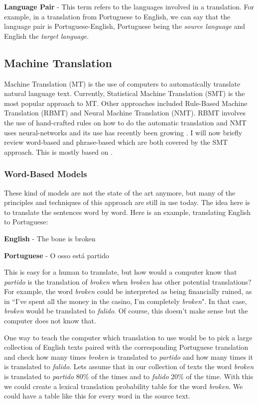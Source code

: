 \textbf{Language Pair} - This term refers to the languages involved in a translation. For example, in a translation from Portuguese to English, we can say that the language pair is Portuguese-English, Portuguese being the \textit{source language} and English the \textit{target language}.


\subsection{Machine Translation}

Machine Translation (MT) is the use of computers to automatically translate natural language text. Currently, Statistical Machine Translation (SMT) is the most popular approach to MT. Other approaches included Rule-Based Machine Translation (RBMT) and  Neural Machine Translation (NMT). RBMT involves the use of hand-crafted rules on how to do the automatic translation and NMT uses neural-networks and its use has recently been growing \citep{Bentivogli2016}. I will now briefly review word-based and phrase-based which are both covered by the SMT approach. This is mostly based on \citep{Koehn2010}.

\subsubsection{Word-Based Models}

These kind of models are not the state of the art anymore, but many of the principles and techniques of this approach are still in use today. The idea here is to translate the sentences word by word. Here is an example, translating English to Portuguese:

\begin{center}
\textbf{English}    - The bone    is      broken

\textbf{Portuguese} -  O  osso   está     partido
\end{center}

This is easy for a human to translate, but how would a computer know that \textit{partido} is the translation of \textit{broken} when \textit{broken} has other potential translations? For example, the word \textit{broken} could be interpreted as being financially ruined, as in “I’ve spent all the money in the casino, I'm completely \textit{broken}". In that case, \textit{broken} would be translated to \textit{falido}. Of course, this doesn't make sense but the computer does not know that.

One way to teach the computer which translation to use would be to pick a large collection of English texts paired with the corresponding Portuguese translation and check how many times \textit{broken} is translated to \textit{partido} and how many times it is translated to \textit{falido}. Lets assume that in our collection of texts the word \textit{broken} is translated to \textit{partido} 80\% of the times and to \textit{falido} 20\% of the time. With this we could create a lexical translation probability table for the word \textit{broken}. We could have a table like this for every word in the source text.

